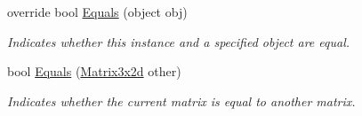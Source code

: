 \begin{DoxyCompactItemize}
override bool \hyperlink{struct_open_t_k_1_1_matrix3x2d_a35c9609cfb91c1be167b35d2015572cc}{Equals} (object obj)
\begin{DoxyCompactList}\small\item\em Indicates whether this instance and a specified object are equal. \end{DoxyCompactList}\item 
bool \hyperlink{struct_open_t_k_1_1_matrix3x2d_a930b887975d6dc30f428afc0f09ff1ec}{Equals} (\hyperlink{struct_open_t_k_1_1_matrix3x2d}{Matrix3x2d} other)
\begin{DoxyCompactList}\small\item\em Indicates whether the current matrix is equal to another matrix. \end{DoxyCompactList}\end{DoxyCompactItemize}

